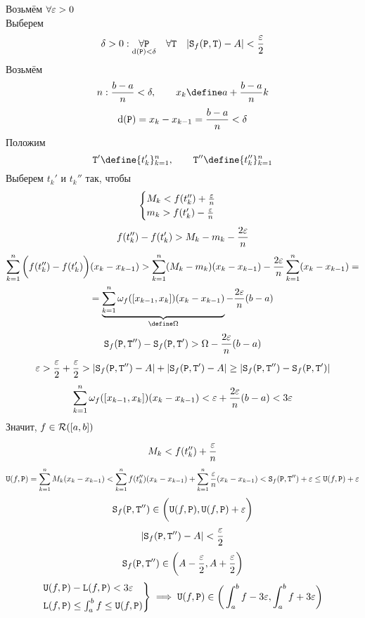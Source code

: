 \begin{iproof}
	\item Возьмём $ \forall \veps > 0 $ \\
    Выберем
    $$ \delta > 0 : \underset{\diam(\Par) < \delta}{\forall \Par} \quad \forall \Teq \quad |\Sr_f(\Par, \Teq) - A| < \half[\veps] $$
    Возьмём
    $$ n : \frac{b - a}n < \delta, \qquad x_k \define a + \frac{b - a}nk $$
    $$ \diam(\Par) = x_k - x_{k - 1} = \frac{b - a}n < \delta $$
    Положим
    $$ \Teq' \define \seq[n]{t_k'}k, \qquad \Teq'' \define \seq[n]{t_k''}k $$
    Выберем $ t_k' $ и $ t_k'' $ так, чтобы
    $$
    \begin{cases}
        M_k < f(t_k'') + \frac\veps{n} \\
        m_k > f(t_k') - \frac\veps{n}
    \end{cases} $$
    $$ f(t_k'') - f(t_k') > M_k - m_k - \frac{2\veps}n $$
    \begin{multline*}
        \sum_{k = 1}^n \bigg( f(t_k'') - f(t_k') \bigg)(x_k - x_{k - 1}) > \sum_{k = 1}^n (M_k - m_k)(x_k - x_{k - 1}) - \frac{2\veps}n \sum_{k = 1}^n(x_k - x_{k - 1}) = \\
        = \underbrace{\sum_{k = 1}^n \omega_f([x_{k - 1}, x_k])(x_k - x_{k - 1})}_{\define \Omega} - \frac{2\veps}n(b - a)
    \end{multline*}
    $$ \Sr_f(\Par, \Teq'') - \Sr_f(\Par, \Teq') > \Omega - \frac{2\veps}n(b - a) $$
    $$ \veps > \half[\veps] + \half[\veps] > |\Sr_f(\Par, \Teq'') - A| + |\Sr_f(\Par, \Teq') - A| \ge |\Sr_f(\Par, \Teq'') - \Sr_f(\Par, \Teq')| $$
    $$ \sum_{k = 1}^n \omega_f([x_{k - 1}, x_k])(x_k - x_{k - 1}) < \veps + \frac{2\veps}n(b - a) < 3\veps $$
    Значит, $ f \in \Ri([a, b]) $
    \item
    $$ M_k < f(t_k'') + \frac\veps{n} $$
    $$ \Ud(f, \Par) = \sum_{k = 1}^n M_k(x_k - x_{k - 1}) < \sum_{k = 1}^n f(t_k'')(x_k - x_{k - 1}) + \sum_{k = 1}^n \frac\veps{n}(x_k - x_{k - 1}) < \Sr_f(\Par, \Teq'') + \veps \le \Ud(f, \Par) + \veps $$
    $$ \Sr_f(\Par, \Teq'') \in \bigg( \Ud(f, \Par), \Ud(f, \Par) + \veps \bigg) $$
    $$ |\Sr_f(\Par, \Teq'') - A| < \half[\veps] $$
    $$ \Sr_f(\Par, \Teq'') \in \bigg( A - \half[\veps], A + \half[\veps] \bigg) $$
    $$
    \begin{rcases}
    	\Ud(f, \Par) - \Ld(f, \Par) < 3\veps \\
        \Ld(f, \Par) \le \int_a^b f \le \Ud(f, \Par)
    \end{rcases} \implies \Ud(f, \Par) \in \bigg( \int_a^b f - 3\veps, \int_a^b f + 3\veps \bigg) $$
\end{iproof}

